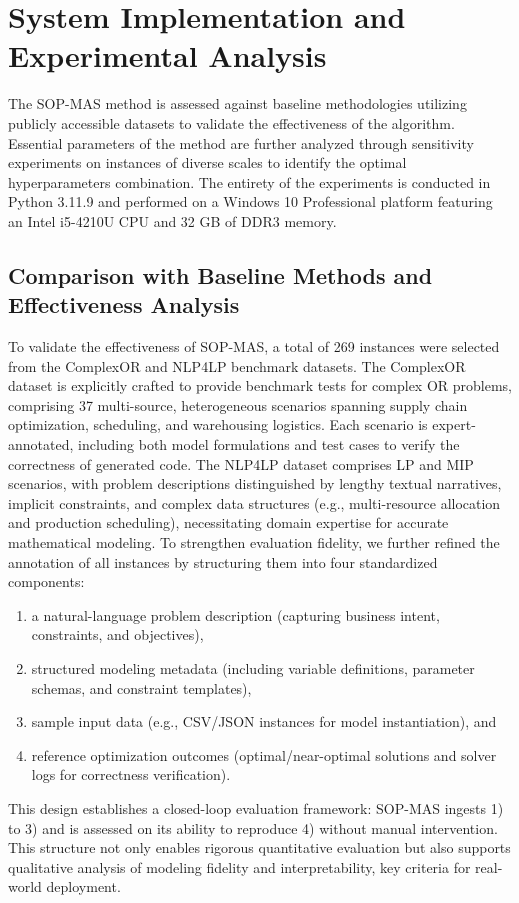 \documentclass[preprint,12pt]{elsarticle}
\begin{document}
\section{System Implementation and Experimental Analysis}

The SOP-MAS method is assessed against baseline methodologies utilizing publicly accessible datasets to validate the effectiveness of the algorithm. Essential parameters of the method are further analyzed through sensitivity experiments on instances of diverse scales to identify the optimal hyperparameters combination. The entirety of the experiments is conducted in Python 3.11.9 and performed on a Windows 10 Professional platform featuring an Intel i5-4210U CPU and 32 GB of DDR3 memory.

\subsection{Comparison with Baseline Methods and Effectiveness Analysis}

To validate the effectiveness of SOP-MAS, a total of 269 instances were selected from the ComplexOR and NLP4LP benchmark datasets. The ComplexOR dataset \cite{xiaoChainofExpertsWhenLLMs2024} is explicitly crafted to provide benchmark tests for complex OR problems, comprising 37 multi-source, heterogeneous scenarios spanning supply chain optimization, scheduling, and warehousing logistics. Each scenario is expert-annotated, including both model formulations and test cases to verify the correctness of generated code. The NLP4LP dataset comprises LP and MIP scenarios, with problem descriptions distinguished by lengthy textual narratives, implicit constraints, and complex data structures (e.g., multi-resource allocation and production scheduling), necessitating domain expertise for accurate mathematical modeling. To strengthen evaluation fidelity, we further refined the annotation of all instances by structuring them into four standardized components:
\begin{enumerate}[label=\arabic*)]
    \item a natural-language problem description (capturing business intent, constraints, and objectives),
    \item structured modeling metadata (including variable definitions, parameter schemas, and constraint templates),
    \item sample input data (e.g., CSV/JSON instances for model instantiation), and
    \item reference optimization outcomes (optimal/near-optimal solutions and solver logs for correctness verification).
\end{enumerate}
This design establishes a closed-loop evaluation framework: SOP-MAS ingests 1) to 3) and is assessed on its ability to reproduce 4) without manual intervention. This structure not only enables rigorous quantitative evaluation but also supports qualitative analysis of modeling fidelity and interpretability, key criteria for real-world deployment.
\end{document}
